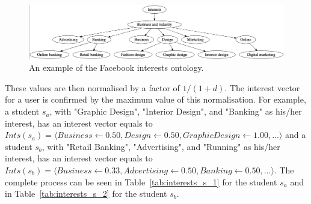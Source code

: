 \begin{figure}
    \centering
    \includegraphics[width=150mm]{ontology.png}
    \caption {An example of the Facebook interests ontology.}
    \label{fig:facebook_ontology}
\end{figure}

These values are then normalised by a factor of $1/(1+d)$. The interest vector for a user is confirmed by the maximum value of this normalisation. 
For example, a student $s_a$, with "Graphic Design", "Interior Design", and "Banking" as his/her interest, has an interest vector equals to $Ints(s_a) = \langle Business \gets 0.50, Design \gets 0.50, Graphic Design \gets 1.00,...\rangle$ and a student $s_b$, with "Retail Banking", "Advertising", and "Running" as his/her interest, has an interest vector equals to $Ints(s_b) = \langle Business \gets 0.33, Advertising \gets 0.50, Banking \gets 0.50,...\rangle$. The complete process can be seen in Table~\ref{tab:interests_s_1} for the student $s_a$ and in Table~\ref{tab:interests_s_2} for the student $s_b$.\\

\begin{table}[]
\centering
{}
\caption{Interests mapping of a $s_1$ example user.}
\label{tab:interests_s_1}
\end{table}


